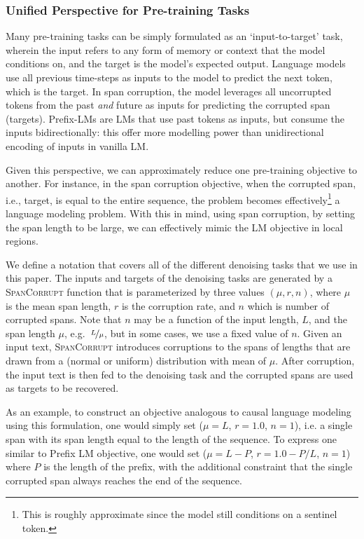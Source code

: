 \documentclass[10pt]{article}
\begin{document}
\subsubsection{Unified Perspective for Pre-training Tasks}
Many pre-training tasks can be simply formulated as an `input-to-target' task, wherein the input refers to any form of memory or context that the model conditions on, and the target is the model's expected output. Language models use all previous time-steps as inputs to the model to predict the next token, which is the target.  
In span corruption, the model leverages all uncorrupted tokens from the past \emph{and} future as inputs for predicting the corrupted span (targets).
Prefix-LMs are LMs that use past tokens as inputs, but consume the inputs bidirectionally: this offer more modelling power than unidirectional encoding of inputs in vanilla LM.

Given this perspective, we can approximately reduce one pre-training objective to another. For instance, in the span corruption objective, when the corrupted span, i.e., target, is equal to the entire sequence, the problem becomes effectively\footnote{This is roughly approximate since the model still conditions on a sentinel token.} a language modeling problem. With this in mind, using span corruption, by setting the span length to be large, we can effectively mimic the LM objective in local regions. 

We define a notation that covers all of the different denoising tasks that we use in this paper. The inputs and targets of the denoising tasks are generated by a \textsc{SpanCorrupt} function that is parameterized by three values $(\mu, r, n)$, where $\mu$ is the mean span length, $r$ is the corruption rate, and $n$ which is number of corrupted spans. Note that $n$ may be a function of the input length, $L$, and the span length $\mu$, e.g.\ $\nicefrac{L}{\mu}$, but in some cases, we use a fixed value of $n$. Given an input text, \textsc{SpanCorrupt} introduces corruptions to the spans of lengths that are drawn from a (normal or uniform) distribution with mean of $\mu$. After corruption, the input text is then fed to the denoising task and the corrupted spans are used as targets to be recovered. 

As an example, to construct an objective analogous to causal language modeling using this formulation, one would simply set ($\mu=L$, $r=1.0$, $n=1$), i.e. a single span with its span length equal to the length of the sequence. To express one similar to Prefix LM objective, one would set ($\mu=L-P$, $r=1.0 - P/L$, $n=1$) where $P$ is the length of the prefix, with the additional constraint that the single corrupted span always reaches the end of the sequence. 
\end{document}
